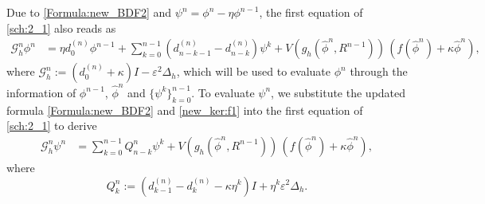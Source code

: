 \documentclass{m2an}
\newcommand{\mg}{\mathcal{G}}
\begin{document}
Due to \eqref{Formula:new_BDF2} and $ \psi^n = \phi^n - \eta \phi^{n-1} $, the first equation of \eqref{sch:2_1} also reads as
\begin{equation}\label{MBP:f1}
	\begin{aligned}
		\mg_h^{n} \phi^{n} & = \eta d^{(n)}_{0} \phi^{n-1} + \sum^{n-1}_{k=0} ( d^{(n)}_{n-k-1} - d^{(n)}_{n-k} ) \psi^{k} +  V( g_h(\hat{\phi}^{n}, R^{n-1}) )\, ( f(\hat{\phi}^{n}) + \kappa \hat{\phi}^{n} ) ,
	\end{aligned}
\end{equation}
where $ \mg_h^{n} :=( d^{(n)}_{0} + \kappa ) I - \varepsilon^2 \Delta_h $, which will be used to evaluate $ \phi^n $ through the information of $ \phi^{n-1}$, $ \hat{\phi}^{n} $ and $ \{ \psi^{k} \}_{k=0}^{n-1} $. 
To evaluate $ \psi^n $, we substitute the updated formula \eqref{Formula:new_BDF2} and \eqref{new_ker:f1} into the first equation of \eqref{sch:2_1}  to derive
\begin{equation}\label{MBP:f2}
	\begin{aligned}
		\mg_h^{n} \psi^{n} 
		& = \sum^{n-1}_{k=0} Q^{n}_{n-k} \psi^{k} + V( g_h(\hat{\phi}^{n}, R^{n-1}))\, ( f(\hat{\phi}^{n}) + \kappa \hat{\phi}^{n} ),
	\end{aligned}
\end{equation}
where
\begin{equation}\label{def:Q}
	Q^{n}_{k} := ( d^{(n)}_{k-1} - d^{(n)}_{k} - \kappa \eta^{k} )I + \eta^{k} \varepsilon^2 \Delta_h.
\end{equation}
\end{document}
